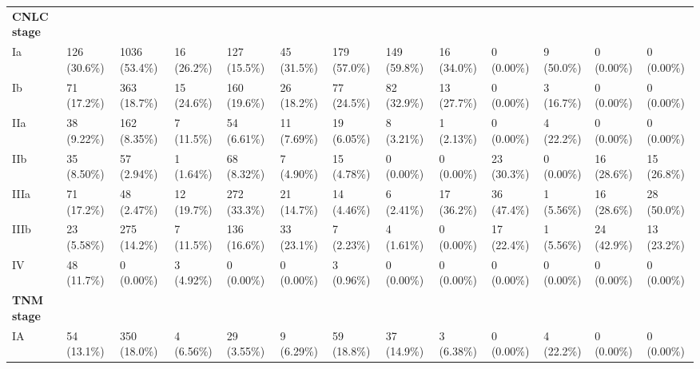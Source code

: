 \documentclass{article}
\begin{document}
\begin{landscape}
\begin{tiny}
\begin{tabularx}{\linewidth}{p{4.5cm}|X|X|X|X|X|X|X|X|X|X|X|X}
\rowcolor{gray!30}
\textbf{CNLC stage }  &  &  &  &  &  &  &  &  &  &  &  &  \\
\rowcolor{gray!10}
    Ia &   126 (30.6\%)    &   1036 (53.4\%)   &    16 (26.2\%)    &   127 (15.5\%)    &    45 (31.5\%)    &   179 (57.0\%)    &   149 (59.8\%)    &    16 (34.0\%)    &    0 (0.00\%)     &    9 (50.0\%)     &    0 (0.00\%)     &    0 (0.00\%)     \\
\rowcolor{gray!10}
    Ib &    71 (17.2\%)    &   363 (18.7\%)    &    15 (24.6\%)    &   160 (19.6\%)    &    26 (18.2\%)    &    77 (24.5\%)    &    82 (32.9\%)    &    13 (27.7\%)    &    0 (0.00\%)     &    3 (16.7\%)     &    0 (0.00\%)     &    0 (0.00\%)     \\
\rowcolor{gray!10}
    IIa &    38 (9.22\%)    &   162 (8.35\%)    &    7 (11.5\%)     &    54 (6.61\%)    &    11 (7.69\%)    &    19 (6.05\%)    &    8 (3.21\%)     &    1 (2.13\%)     &    0 (0.00\%)     &    4 (22.2\%)     &    0 (0.00\%)     &    0 (0.00\%)     \\
\rowcolor{gray!10}
    IIb &    35 (8.50\%)    &    57 (2.94\%)    &    1 (1.64\%)     &    68 (8.32\%)    &    7 (4.90\%)     &    15 (4.78\%)    &    0 (0.00\%)     &    0 (0.00\%)     &    23 (30.3\%)    &    0 (0.00\%)     &    16 (28.6\%)    &    15 (26.8\%)    \\
\rowcolor{gray!10}
    IIIa &    71 (17.2\%)    &    48 (2.47\%)    &    12 (19.7\%)    &   272 (33.3\%)    &    21 (14.7\%)    &    14 (4.46\%)    &    6 (2.41\%)     &    17 (36.2\%)    &    36 (47.4\%)    &    1 (5.56\%)     &    16 (28.6\%)    &    28 (50.0\%)    \\
\rowcolor{gray!10}
    IIIb &    23 (5.58\%)    &   275 (14.2\%)    &    7 (11.5\%)     &   136 (16.6\%)    &    33 (23.1\%)    &    7 (2.23\%)     &    4 (1.61\%)     &    0 (0.00\%)     &    17 (22.4\%)    &    1 (5.56\%)     &    24 (42.9\%)    &    13 (23.2\%)    \\
\rowcolor{gray!10}
    IV &    48 (11.7\%)    &    0 (0.00\%)     &    3 (4.92\%)     &    0 (0.00\%)     &    0 (0.00\%)     &    3 (0.96\%)     &    0 (0.00\%)     &    0 (0.00\%)     &    0 (0.00\%)     &    0 (0.00\%)     &    0 (0.00\%)     &    0 (0.00\%)     \\
\rowcolor{gray!30}
\textbf{TNM stage }  &  &  &  &  &  &  &  &  &  &  &  &  \\
\rowcolor{gray!10}
    IA &    54 (13.1\%)    &   350 (18.0\%)    &    4 (6.56\%)     &    29 (3.55\%)    &    9 (6.29\%)     &    59 (18.8\%)    &    37 (14.9\%)    &    3 (6.38\%)     &    0 (0.00\%)     &    4 (22.2\%)     &    0 (0.00\%)     &    0 (0.00\%)     \\

\end{tabularx}
\end{tiny}
\end{landscape}
\end{document}
